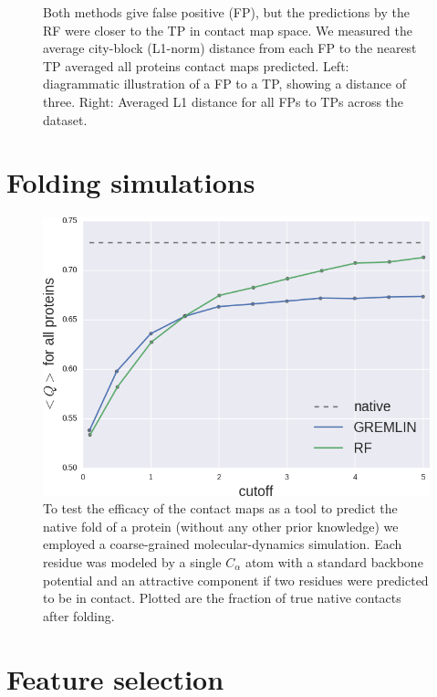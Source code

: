 \documentclass[landscape]{sciposter}
\newlength{\customfigheight}
\begin{document}
\begin{multicols}{3}
\begin{figure}
\caption{%
Both methods give false positive (FP), but the predictions by the RF were closer to the TP in contact map space.
We measured the average city-block (L1-norm) distance from each FP to the nearest TP averaged all proteins contact maps predicted. 
Left: diagrammatic illustration of a FP to a TP, showing a distance of three. Right: Averaged L1 distance for all FPs to TPs across the dataset.
}
\end{figure}

\vfill \columnbreak

\section*{Folding simulations}
\begin{figure}
    \center 
    \includegraphics[height=1.25\customfigheight]{figures/folding/Q_avg.png}

\caption{
To test the efficacy of the contact maps as a tool to predict the native fold of a protein (without any other prior knowledge) we employed a coarse-grained molecular-dynamics simulation. 
Each residue was modeled by a single $C_\alpha$ atom with a standard backbone potential and an attractive component if two residues were predicted to be in contact.
Plotted are the fraction of true native contacts after folding.
}
\end{figure}


\vfill \columnbreak

\section*{Feature selection}


\end{multicols}
\end{document}
